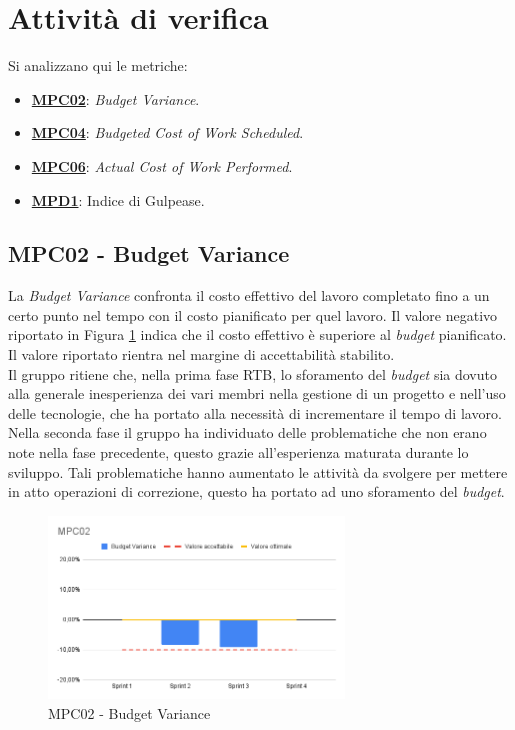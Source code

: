 \section{Attività di verifica}
Si analizzano qui le metriche:
\begin{itemize}
    \item \hyperref[s:mpc02]{\textbf{MPC02}}\textbf{}: \textit{Budget Variance}.
    \item \hyperref[s:mpc04]{\textbf{MPC04}}\textbf{}: \textit{Budgeted Cost of Work Scheduled}.
    \item \hyperref[s:mpc06]{\textbf{MPC06}}\textbf{}: \textit{Actual Cost of Work Performed}.
    \item \hyperref[s:mpd1]{\textbf{MPD1}}\textbf{}: Indice di Gulpease.
\end{itemize}

\subsection{MPC02 - Budget Variance}
\label{s:mpc02}
La \textit{Budget Variance} confronta il costo effettivo del lavoro completato fino a un certo punto nel tempo con il costo pianificato per quel lavoro.
Il valore negativo riportato in Figura \ref{fig:mpc02} indica che il costo effettivo è superiore al \textit{budget} pianificato.
Il valore riportato rientra nel margine di accettabilità stabilito. \\
Il gruppo ritiene che, nella prima fase RTB, lo sforamento del \textit{budget} sia dovuto alla generale inesperienza dei vari membri nella gestione di un progetto e nell'uso delle tecnologie, che ha portato alla necessità di incrementare il tempo di lavoro.\\
Nella seconda fase il gruppo ha individuato delle problematiche che non erano note nella fase precedente, questo grazie all'esperienza maturata durante lo sviluppo. 
Tali problematiche hanno aumentato le attività da svolgere per mettere in atto operazioni di correzione, questo ha portato ad uno sforamento del \textit{budget}.

\begin{figure}[htbp]
    \centering
    \includegraphics[width=0.7\textwidth]{img/MPC02.png}
    \caption{MPC02 - Budget Variance}
    \label{fig:mpc02}
\end{figure}


